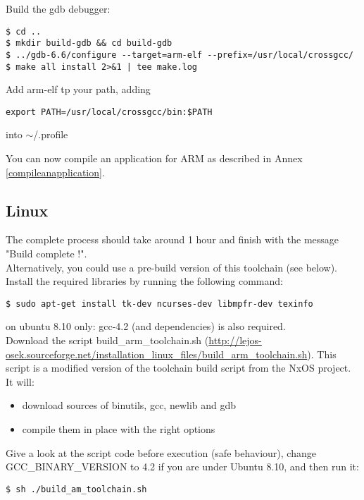 Build the gdb debugger:

\begin{verbatim}
$ cd ..
$ mkdir build-gdb && cd build-gdb
$ ../gdb-6.6/configure --target=arm-elf --prefix=/usr/local/crossgcc/
$ make all install 2>&1 | tee make.log
\end{verbatim}

Add arm-elf tp your path, adding
\begin{verbatim}
export PATH=/usr/local/crossgcc/bin:$PATH
\end{verbatim}
into $\sim$/.profile

You can now compile an application for ARM as described in Annex \ref{compileanapplication}.

\subsection{Linux}
The complete process should take around 1 hour and finish with the message "Build complete !". \\
Alternatively, you could use a pre-build version of this toolchain (see below).\\

Install the required libraries by running the following command:
\begin{verbatim}
$ sudo apt-get install tk-dev ncurses-dev libmpfr-dev texinfo
\end{verbatim}
on ubuntu 8.10 only: gcc-4.2 (and dependencies) is also required.\\

Download the script build_arm_toolchain.sh (\href{http://lejos-osek.sourceforge.net/installation_linux_files/build_arm_toolchain.sh}{http://lejos-osek.sourceforge.net/installation_linux_files/build_arm_toolchain.sh}). This script is a modified version of the toolchain build script from the NxOS project. It will:
\begin{itemize}
\item download sources of binutils, gcc, newlib and gdb
\item compile them in place with the right options
\end{itemize}

Give a look at the script code before execution (safe behaviour), change GCC_BINARY_VERSION to 4.2 if you are under Ubuntu 8.10, and then run it:
\begin{verbatim}
$ sh ./build_am_toolchain.sh
\end{verbatim}

